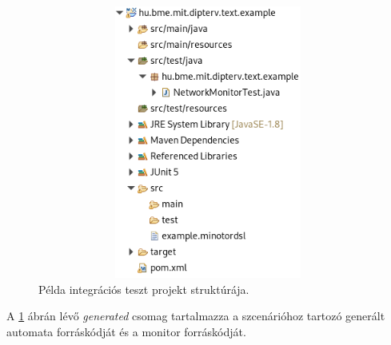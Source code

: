 \begin{figure}[!ht]
    \centering
    \includegraphics[width=150mm, height=9cm, keepaspectratio]{figures/integration_test_structure.png}
    \caption{Példa integrációs teszt projekt struktúrája.}
    \label{integration_test_structure}
\end{figure}

A \ref{integration_test_structure} ábrán lévő \textit{generated} csomag tartalmazza a szcenárióhoz tartozó generált automata forráskódját és a monitor forráskódját.

